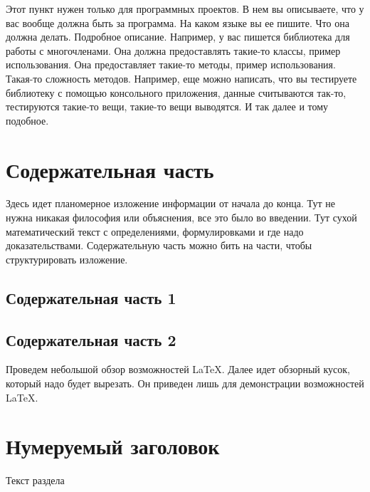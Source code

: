 \documentclass{article}
\begin{document}
Этот пункт нужен только для программных проектов. В нем вы описываете, что у вас вообще должна быть за программа. На каком языке вы ее пишите. Что она должна делать. Подробное описание. Например, у вас пишется библиотека для работы с многочленами. Она должна предоставлять такие-то классы, пример использования. Она предоставляет такие-то методы, пример использования. Такая-то сложность методов. Например, еще можно написать, что вы тестируете библиотеку с помощью консольного приложения, данные считываются так-то, тестируются такие-то вещи, такие-то вещи выводятся. И так далее и тому подобное.

\section{Содержательная часть}

Здесь идет планомерное изложение информации от начала до конца. Тут не нужна никакая философия или объяснения, все это было во введении. Тут сухой математический текст с определениями, формулировками и где надо доказательствами. Содержательную часть можно бить на части, чтобы структурировать изложение.

\subsection{Содержательная часть 1}

\subsection{Содержательная часть 2}




\appendix

Проведем небольшой обзор возможностей \LaTeX. Далее идет обзорный кусок, который надо будет вырезать. Он приведен лишь для демонстрации возможностей \LaTeX.

\section{Нумеруемый заголовок}
Текст раздела
\end{document}
